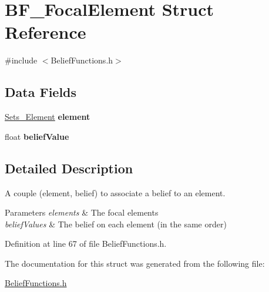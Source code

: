 \hypertarget{struct_b_f___focal_element}{
\section{BF\_\-FocalElement Struct Reference}
\label{struct_b_f___focal_element}
}


{\ttfamily \#include $<$BeliefFunctions.h$>$}

\subsection*{Data Fields}
\begin{DoxyCompactItemize}
\item 
\hypertarget{struct_b_f___focal_element_a9a710ad49ddbc706371fa96ab1d1a4fa}{
\hyperlink{struct_sets___element}{Sets\_\-Element} {\bfseries element}}
\label{struct_b_f___focal_element_a9a710ad49ddbc706371fa96ab1d1a4fa}

\item 
\hypertarget{struct_b_f___focal_element_a59bb288073cdc2754b6d0ebc93b478d0}{
float {\bfseries beliefValue}}
\label{struct_b_f___focal_element_a59bb288073cdc2754b6d0ebc93b478d0}

\end{DoxyCompactItemize}


\subsection{Detailed Description}
A couple (element, belief) to associate a belief to an element. 
\begin{DoxyParams}{Parameters}
{\em elements} & The focal elements \\
\hline
{\em beliefValues} & The belief on each element (in the same order) \\
\hline
\end{DoxyParams}


Definition at line 67 of file BeliefFunctions.h.



The documentation for this struct was generated from the following file:\begin{DoxyCompactItemize}
\item 
\hyperlink{_belief_functions_8h}{BeliefFunctions.h}\end{DoxyCompactItemize}
